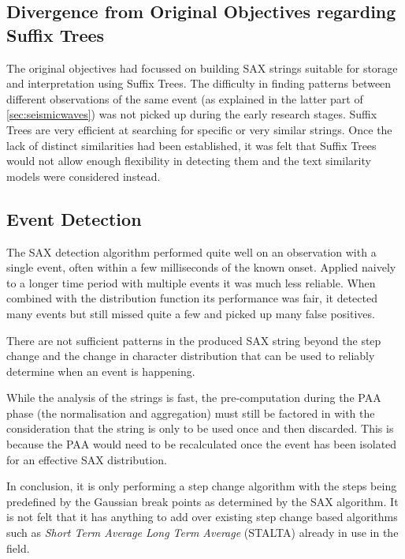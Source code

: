 \documentclass[../report.tex]{subfiles}
\begin{document}
		
\subsection{Divergence from Original Objectives regarding Suffix Trees} \label{sec:alteration-objectives}
	
	The original objectives had focussed on building SAX strings suitable for storage and interpretation using Suffix Trees.  The difficulty in finding patterns between different observations of the same event (as explained in the latter part of \cref{sec:seismicwaves}) was not picked up during the early research stages.  Suffix Trees are very efficient at searching for specific or very similar strings.  Once the lack of distinct similarities had been established, it was felt that Suffix Trees would not allow enough flexibility in detecting them and the text similarity models were considered instead.

\subsection{Event Detection}

	The SAX detection algorithm performed quite well on an observation with a single event, often within a few milliseconds of the known onset.  Applied naively to a longer time period with multiple events it was much less reliable.  When combined with the distribution function its performance was fair, it detected many events but still missed quite a few and picked up many false positives.
	
	There are not sufficient patterns in the produced SAX string beyond the step change and the change in character distribution that can be used to reliably determine when an event is happening.
	
	While the analysis of the strings is fast, the pre-computation during the PAA phase (the normalisation and aggregation) must still be factored in with the consideration that the string is only to be used once and then discarded.  This is because the PAA would need to be recalculated once the event has been isolated for an effective SAX distribution.
	
	In conclusion, it is only performing a step change algorithm with the steps being predefined by the Gaussian break points as determined by the SAX algorithm.  It is not felt that it has anything to add over existing step change based algorithms such as \textit{Short Term Average Long Term Average} (STALTA) already in use in the field.
\end{document}

